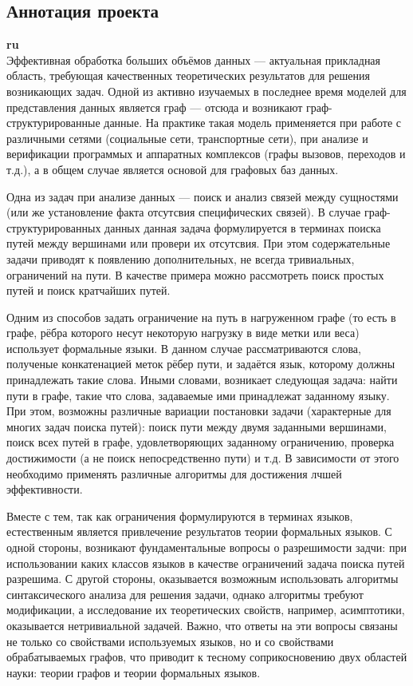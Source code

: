 \documentclass[12pt]{article}  %
\theoremstyle{remark}
\begin{document}
\subsection{Аннотация проекта}
\textbf{ru}\\
%
Эффективная обработка больших объёмов данных --- актуальная прикладная область, требующая качественных теоретических результатов для решения возникающих задач.
Одной из активно изучаемых в последнее время моделей для представления данных является граф --- отсюда и возникают граф-структурированные данные.
На практике такая модель применяется при работе с различными сетями (социальные сети, транспортные сети), при анализе и верификации программых и аппаратных комплексов (графы вызовов, переходов и т.д.), а в общем случае является основой для графовых баз данных.

Одна из задач при анализе данных --- поиск и анализ связей между сущностями (или же установление факта отсутсвия специфических связей). 
В случае граф-структурированных данных данная задача формулируется в терминах поиска путей между вершинами или провери их отсутсвия.
При этом содержательные задачи приводят к появлению дополнительных, не всегда тривиальных, ограничений на пути.
В качестве примера можно рассмотреть поиск простых путей и поиск кратчайших путей.

Одним из способов задать ограничение на путь в нагруженном графе (то есть в графе, рёбра которого несут некоторую нагрузку в виде метки или веса) использует формальные языки.
В данном случае рассматриваются слова, полученые конкатенацией меток рёбер пути, и задаётся язык, которому должны принадлежать такие слова.
Иными словами, возникает следующая задача: найти пути в графе, такие что слова, задаваемые ими принадлежат заданному языку.
При этом, возможны различные вариации постановки задачи (характерные для многих задач поиска путей): поиск пути между двумя заданными вершинами, поиск всех путей в графе, удовлетворяющих заданному ограничению, проверка достижимости (а не поиск непосредственно пути) и т.д.
В зависимости от этого необходимо применять различные алгоритмы для достижения лчшей эффективности.

Вместе с тем, так как ограничения формулируются в терминах языков, естественным является привлечение результатов теории формальных языков. 
С одной стороны, возникают фундаментальные вопросы о разрешимости задчи: при использовании каких классов языков в качестве ограничений задача поиска путей разрешима.
С другой стороны, оказывается возможным использовать алгоритмы синтаксического анализа для решения задачи, однако алгоритмы требуют модификации, а исследование их теоретических свойств, например, асимптотики, оказывается нетривиальной задачей.
Важно, что ответы на эти вопросы связаны не только со свойствами используемых языков, но и со свойствами обрабатываемых графов, что приводит к тесному соприкосновению двух областей науки: теории графов и теории формальных языков.
\end{document}
